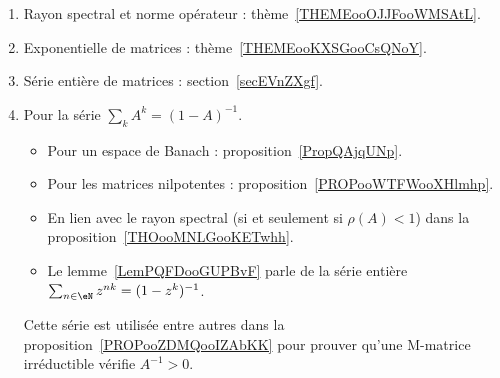
       \label{THEMEooPQKDooTAVKFH}

\begin{enumerate}
	\item
	      Rayon spectral et norme opérateur : thème~\ref{THEMEooOJJFooWMSAtL}.
	\item
	      Exponentielle de matrices : thème~\ref{THEMEooKXSGooCsQNoY}.
	\item
	      Série entière de matrices : section~\ref{secEVnZXgf}.
	\item
	      Pour la série \( \sum_kA^k=(1-A)^{-1}\).
	      \begin{itemize}
		      \item Pour un espace de Banach : proposition~\ref{PropQAjqUNp}.
		      \item Pour les matrices nilpotentes : proposition~\ref{PROPooWTFWooXHlmhp}.
		      \item En lien avec le rayon spectral (si et seulement si \( \rho(A)<1\)) dans la proposition~\ref{THOooMNLGooKETwhh}.
		      \item Le lemme~\ref{LemPQFDooGUPBvF} parle de la série entière \( \sum_{n\in \eN}z^{nk}=(1-z^k)^{-1}\).
	      \end{itemize}
	      Cette série est utilisée entre autres dans la proposition~\ref{PROPooZDMQooIZAbKK} pour prouver qu'une M-matrice irréductible vérifie \( A^{-1}>0\).
\end{enumerate}
